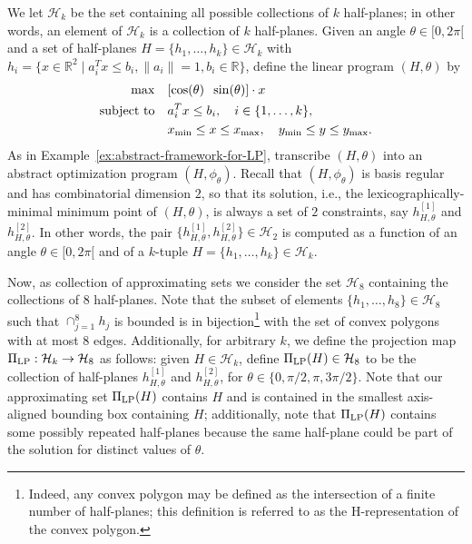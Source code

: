 \documentclass[onecolumn,journal,letterpaper]{IEEEtran}
\newcommand{\real}{{\mathbb{R}}}
\newcommand{\subscr}[2]{{#1}_{\textup{#2}}}
\newcommand{\intersection}{\ensuremath{\operatorname{\cap}}}
\newcommand{\map}[3]{#1: #2 \rightarrow #3}
\newcommand{\setdef}[2]{\{#1 \; | \; #2\}}
\newcommand{\norm}[1]{\|#1\|}
\newcommand{\xmin}{\subscr{x}{min}}
\newcommand{\xmax}{\subscr{x}{max}}
\newcommand{\ymin}{\subscr{y}{min}}
\newcommand{\ymax}{\subscr{y}{max}}
\newcommand{\until}[1]{\{1,\dots,#1\}}
\newcommand{\HH}{\mathcal{H}}
\newcommand{\subject}{\text{subject to}}
\newcommand{\supind}[2]{{#1}^{[#2]}}
\newcommand{\PiLP}{\Pi_{\textup{LP}}}
\begin{document}
We let $\HH_k$ be the set containing all possible collections of $k$
half-planes; in other words, an element of $\HH_k$ is a collection of $k$
half-planes.  Given an angle $\theta\in{[0,2\pi[}$ and a set of half-planes
$H = \{h_1, \ldots, h_k\}\in\HH_k$ with $h_i = \setdef{x\in\real^2}{a_i^T x
  \leq b_i, \norm{a_i}{}=1, b_i\in\real}$, define the linear program
$(H,\theta)$ by
\begin{equation} \label{eq:vtheta}
  \begin{split}
    \max   &\quad [\cos(\theta)\;\; \sin(\theta)] \cdot x\\
    \subject &\quad a_i^T x \leq b_i, \quad i\in\until{k}, \\
    & \quad \xmin\leq{x}\leq\xmax, \quad \ymin\leq{y}\leq\ymax.
  \end{split}
\end{equation}
As in Example~\ref{ex:abstract-framework-for-LP}, transcribe $(H,\theta)$
into an abstract optimization program $(H,\phi_\theta)$.  Recall that
$(H,\phi_\theta)$ is basis regular and has combinatorial dimension $2$, so
that its solution, i.e., the lexicographically-minimal minimum point of
$(H,\theta)$, is always a set of $2$ constraints, say
$\supind{h}{1}_{H,\theta}$ and $\supind{h}{2}_{H,\theta}$.  In other words,
the pair $\{\supind{h}{1}_{H,\theta},\supind{h}{2}_{H,\theta}\} \in \HH_2$
is computed as a function of an angle $\theta\in{[0,2\pi[}$ and of a
$k$-tuple $H=\{h_1,\ldots,h_k\}\in\HH_k$.

Now, as collection of approximating sets we consider the set $\HH_8$
containing the collections of $8$ half-planes. Note that the subset of
elements $\{h_1,\dots,h_8\} \in \HH_8$ such that $\intersection_{j=1}^8h_j$
is bounded is in bijection\footnote{Indeed, any convex polygon may be
  defined as the intersection of a finite number of half-planes; this
  definition is referred to as the H-representation of the convex polygon.}
with the set of convex polygons with at most $8$ edges.  Additionally, for
arbitrary $k$, we define the projection map $\map{\PiLP}{\HH_k}{\HH_8}$ as
follows: given $H\in\HH_k$, define $\PiLP(H)\in \HH_8$ to be the collection
of half-planes $\supind{h}{1}_{H,\theta}$ and $\supind{h}{2}_{H,\theta}$,
for $\theta \in \{0, \pi/2, \pi, 3\pi/2\}$. Note that our approximating set
$\PiLP(H)$ contains $H$ and is contained in the smallest axis-aligned
bounding box containing $H$; additionally, note that $\PiLP(H)$ contains
some possibly repeated half-planes because the same half-plane could be
part of the solution for distinct values of $\theta$.
\end{document}
